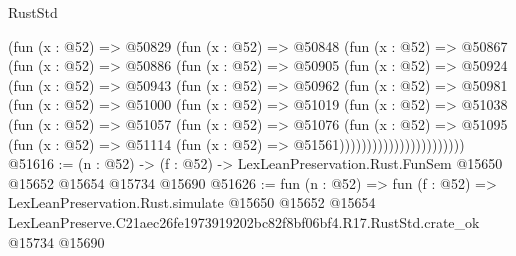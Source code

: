 \begin{lexlean}{RustStd}
\begin{coremodule}
                (fun (x : @52) =>
                @50829
                  (fun (x : @52) =>
                  @50848
                    (fun (x : @52) =>
                    @50867
                      (fun (x : @52) =>
                      @50886
                        (fun (x : @52) =>
                        @50905
                          (fun (x : @52) =>
                          @50924
                            (fun (x : @52) =>
                            @50943
                              (fun (x : @52) =>
                              @50962
                                (fun (x : @52) =>
                                @50981
                                  (fun (x : @52) =>
                                  @51000
                                    (fun (x : @52) =>
                                    @51019
                                      (fun (x : @52) =>
                                      @51038
                                        (fun (x : @52) =>
                                        @51057
                                          (fun (x : @52) =>
                                          @51076
                                            (fun (x : @52) =>
                                            @51095
                                              (fun (x : @52) =>
                                              @51114 (fun (x : @52) => @51561)))))))))))))))))))))))
@51616 := (n : @52) ->
  (f : @52) -> LexLeanPreservation.Rust.FunSem @15650 @15652 @15654 @15734 @15690
@51626 := fun (n : @52) =>
  fun (f : @52) =>
  LexLeanPreservation.Rust.simulate
    @15650
    @15652
    @15654
    LexLeanPreserve.C21aec26fe1973919202bc82f8bf06bf4.R17.RustStd.crate_ok
    @15734
    @15690
\end{coremodule}
\end{lexlean}
